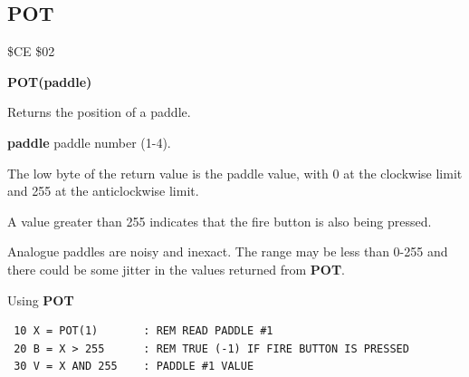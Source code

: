 \subsection{POT}
\begin{description}[leftmargin=2cm,style=nextline]
\item [Token:] \$CE \$02
\item [Format:] {\bf POT(paddle)}
\item [Usage:]  Returns the position of a paddle.

                {\bf paddle} paddle number (1-4).

                The low byte of the return value is the
                paddle value, with 0 at the clockwise limit and 255 at the
                anticlockwise limit.

                A value greater than 255 indicates that the fire button
                is also being pressed.

\item [Remarks:] Analogue paddles are noisy and inexact.
                 The range may be less than 0-255 and there
                 could be some jitter in the values returned from {\bf POT}.


\item [Example:] Using {\bf POT}

\begin{tcolorbox}[colback=black,coltext=white]
\verbatimfont{\codefont}
\begin{verbatim}
 10 X = POT(1)       : REM READ PADDLE #1
 20 B = X > 255      : REM TRUE (-1) IF FIRE BUTTON IS PRESSED
 30 V = X AND 255    : PADDLE #1 VALUE
\end{verbatim}
\end{tcolorbox}
\end{description}


\newpage
